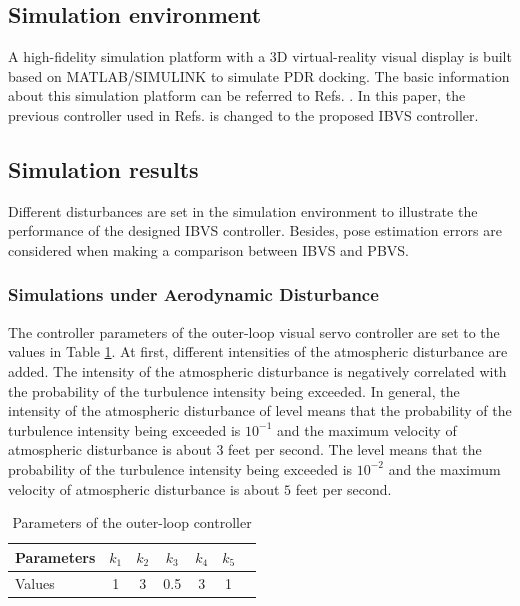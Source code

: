 \subsection{Simulation environment}
A high-fidelity simulation platform with a 3D virtual-reality visual display is built based on MATLAB/SIMULINK to simulate PDR docking. The basic information about this simulation platform can be referred to Refs. \cite{DAI2016448,7738351}. In this paper, the previous controller used in Refs. \cite{DAI2016448} is changed to the proposed IBVS
controller.


\subsection{Simulation results}
Different disturbances are set in the simulation environment to illustrate the performance of the designed IBVS controller. Besides, pose estimation errors are considered when making a comparison between IBVS and PBVS.


\subsubsection{Simulations under Aerodynamic Disturbance}   

The controller parameters of the outer-loop visual servo controller are set to the values in Table \ref{tab1}. At first, different intensities of the atmospheric disturbance are added. The intensity of the atmospheric disturbance is negatively correlated with the probability of the turbulence intensity being exceeded. In general, the intensity of the atmospheric disturbance of level \uppercase\expandafter{} means that the probability of the turbulence intensity being exceeded is ${10^{ - 1}}$ and the maximum velocity of atmospheric disturbance is about $3$ feet per second. The level \uppercase\expandafter{} means that the probability of the turbulence intensity being exceeded is ${10^{ - 2}}$ and the maximum velocity of atmospheric disturbance is about $5$ feet per second.
\begin{table}[h]
	\caption{Parameters of the outer-loop controller}
	\label{tab:Parameters of the outer loop}
	\centering
	\begin{tabular}{|l|c|c|c|c|c|c|}\hline
		Parameters&$ k_{1} $&$ k_{2} $&$ k_{3} $&$ k_{4} $&$ k_{5} $\\\hline
		Values&1&3&0.5&3&1\\\hline
	\end{tabular}\label{tab1}
\end{table} 

